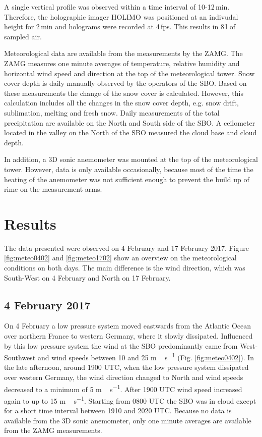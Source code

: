\documentclass[draft,linenumbers]{agujournal}
\begin{document}
A single vertical profile was observed within a time interval of 10-12\,\si{min}. Therefore, the holographic imager HOLIMO was positioned at an indivudal height for 2\,\si{min} and holograms were recorded at 4\,\si{fps}. This results in 8\,\si{l} of sampled air. 
 

Meteorological data are available from the measurements by the ZAMG. The ZAMG measures one minute averages of temperature, relative humidity and horizontal wind speed and direction at the top of the meteorological tower. Snow cover depth is daily manually observed by the operators of the SBO. Based on these measurements the change of the snow cover is calculated. However, this calculation includes all the changes in the snow cover depth, e.g. snow drift, sublimation, melting and fresh snow. Daily measurements of the total precipitation are available on the North and South side of the SBO. A ceilometer located in the valley on the North of the SBO measured the cloud base and cloud depth. 

In addition, a 3D sonic anemometer was mounted at the top of the meteorological tower. However, data is only available occasionally, because most of the time the heating of the anemometer was not sufficient enough to prevent the build up of rime on the measurement arms. 

\section{Results}
\label{Results}

The data presented were observed on 4 February and 17 February 2017. Figure \ref{fig:meteo0402} and \ref{fig:meteo1702} show an overview on the meteorological conditions on both days. The main difference is the wind direction, which was South-West on 4 February and North on 17 February. 

\subsection{4 February 2017}

On 4 February a low pressure system moved eastwards from the Atlantic Ocean over northern France to western Germany, where it slowly dissipated. Influenced by this low pressure system the wind at the SBO predominantly came from West-Southwest and wind speeds between 10 and 25 \si{m\,s^{-1}} (Fig. \ref{fig:meteo0402}). In the late afternoon, around 1900 UTC, when the low pressure system dissipated over western Germany, the wind direction changed to North and wind speeds decreased to a minimum of 5 \si{m\,s^{-1}}. After 1900 UTC wind speed increased again to up to 15 \si{m\,s^{-1}}. Starting from 0800 UTC the SBO was in cloud except for a short time interval between 1910 and 2020 UTC. Because no data is available from the 3D sonic anemometer, only one minute averages are available from the ZAMG measurements. 
\end{document}
